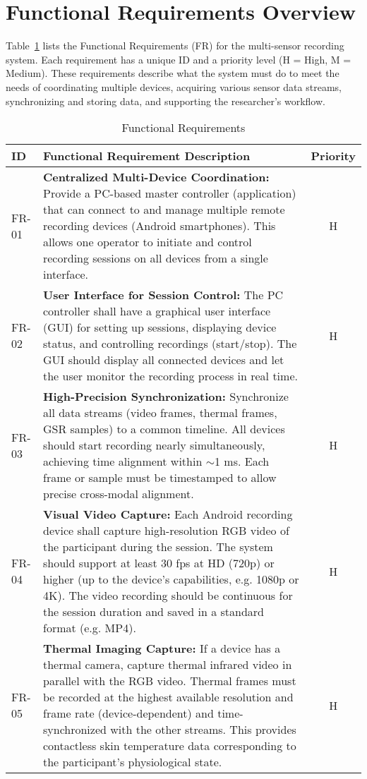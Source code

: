 \section{Functional Requirements Overview}

Table~\ref{tab:functional-requirements} lists the Functional Requirements (FR) for the multi-sensor recording system. Each requirement has a unique ID and a priority level (H = High, M = Medium). These requirements describe what the system must do to meet the needs of coordinating multiple devices, acquiring various sensor data streams, synchronizing and storing data, and supporting the researcher's workflow.

\begin{table}[htbp]
\centering
\caption{Functional Requirements}
\label{tab:functional-requirements}
\begin{tabular}{|p{1cm}|p{10cm}|c|}
\hline
\textbf{ID} & \textbf{Functional Requirement Description} & \textbf{Priority} \\
\hline
FR-01 & \textbf{Centralized Multi-Device Coordination:} Provide a PC-based master controller (application) that can connect to and manage multiple remote recording devices (Android smartphones). This allows one operator to initiate and control recording sessions on all devices from a single interface. & H \\
\hline
FR-02 & \textbf{User Interface for Session Control:} The PC controller shall have a graphical user interface (GUI) for setting up sessions, displaying device status, and controlling recordings (start/stop). The GUI should display all connected devices and let the user monitor the recording process in real time. & H \\
\hline
FR-03 & \textbf{High-Precision Synchronization:} Synchronize all data streams (video frames, thermal frames, GSR samples) to a common timeline. All devices should start recording nearly simultaneously, achieving time alignment within $\sim$1 ms. Each frame or sample must be timestamped to allow precise cross-modal alignment. & H \\
\hline
FR-04 & \textbf{Visual Video Capture:} Each Android recording device shall capture high-resolution RGB video of the participant during the session. The system should support at least 30 fps at HD (720p) or higher (up to the device's capabilities, e.g. 1080p or 4K). The video recording should be continuous for the session duration and saved in a standard format (e.g. MP4). & H \\
\hline
FR-05 & \textbf{Thermal Imaging Capture:} If a device has a thermal camera, capture thermal infrared video in parallel with the RGB video. Thermal frames must be recorded at the highest available resolution and frame rate (device-dependent) and time-synchronized with the other streams. This provides contactless skin temperature data corresponding to the participant's physiological state. & H \\

\end{tabular}
\end{table}

